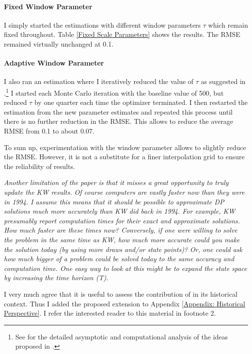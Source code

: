 \begin{boenumerate}
\paragraph{Fixed Window Parameter} I simply started the estimations with different window parameters $\tau$ which remain fixed throughout. Table \ref{Fixed Scale Parameters} shows the results. The RMSE remained virtually unchanged at 0.1.



\paragraph{Adaptive Window Parameter} I also ran an estimation where I iteratively reduced the value of $\tau$ as suggested in \citet{Keane.2003}.\footnote{See \citet{Bruins.2015} for the detailed asymptotic and computational analysis of the ideas proposed in \citet{Keane.2003}.} I started each Monte Carlo iteration with the baseline value of 500, but reduced $\tau$ by one quarter each time the optimizer terminated. I then restarted the estimation from the new parameter estimates and repeated this process until there is no further reduction in the RMSE. This allows to reduce the average RMSE from 0.1 to about 0.07.\newline

To sum up, experimentation with the window parameter allows to slightly reduce the RMSE. However, it is not a substitute for a finer interpolation grid to ensure the reliability of results.\newline
\item \textit{Another limitation of the paper is that it misses a great opportunity to truly update the KW results. Of course computers are vastly faster now than they were in 1994. I assume this means that it should be possible to approximate DP solutions much more accurately than KW did back in 1994. For example, KW presumably report computation times for their exact and approximate solutions. How much faster are these times now? Conversely, if one were willing to solve the problem in the same time as KW, how much more accurate could you make the solution today (by using more draws and/or state points)? Or, one could ask how much bigger of a problem could be solved today to the same accuracy and computation time. One easy way to look at this might be to expand the state space by increasing the time horizon (T).}\vspace{0.5cm}

I very much agree that it is useful to assess the contribution of \citet{Keane.1994} in its historical context. Thus I added the proposed extension to Appendix \ref{Appendix: Historical Perspective}. I refer the interested reader to this material in footnote 2.
\end{boenumerate}
